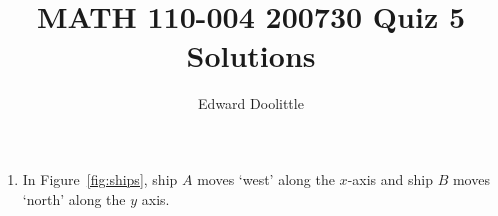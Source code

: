 \documentclass[12pt]{article}
\title{MATH 110-004 200730 Quiz 5 Solutions}
\author{Edward Doolittle}
\begin{document}
\maketitle

\begin{enumerate}
\item In Figure~\ref{fig:ships}, ship $A$ moves `west' along the $x$-axis
  and ship $B$ moves `north' along the $y$ axis.
\end{enumerate}
\end{document}
